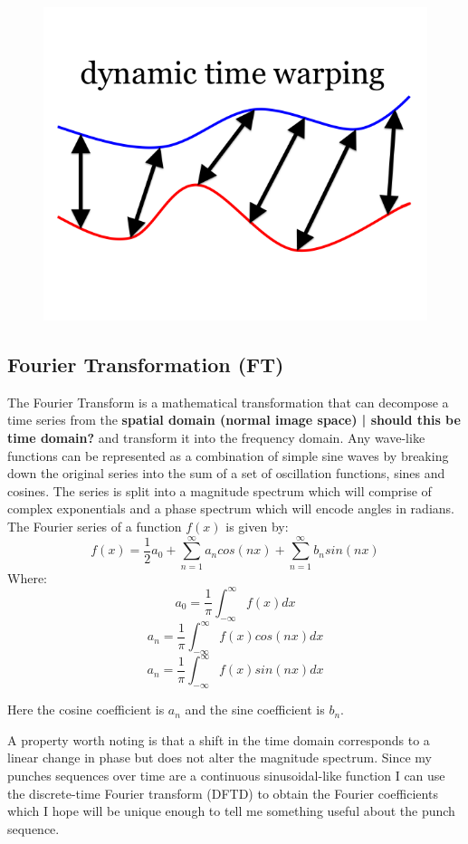 \begin{figure}[h]
    \centering
    \includegraphics[height=0.25\textheight]{fig02/dtw}
    \label{fig:kinect}
\end{figure}


\subsection{Fourier Transformation (FT)}
The Fourier Transform is a mathematical transformation that can decompose a time series from the {\bf spatial domain (normal image space) | should this be time domain?} and transform it into the frequency domain. Any wave-like functions can be represented as a combination of simple sine waves by breaking down the original series into the sum of a set of oscillation functions, sines and cosines. The series is split into a magnitude spectrum which will comprise of complex exponentials and a phase spectrum which will encode angles in radians. 
The Fourier series of a function $f(x)$ is given by:
$$f(x)=\frac{1}{2}a_0 + \sum_{n=1}^\infty a_n cos(nx) + \sum_{n=1}^\infty b_n sin(nx)$$
Where:
$$a_0 = \frac{1}{\pi}\int_{-\infty}^\infty f(x)dx$$
$$a_n = \frac{1}{\pi}\int_{-\infty}^\infty f(x)cos(nx)dx$$
$$a_n = \frac{1}{\pi}\int_{-\infty}^\infty f(x)sin(nx)dx$$

Here the cosine coefficient is $a_n$ and the sine coefficient is $b_n$.

A property worth noting is that a shift in the time domain corresponds to a linear change in phase but does not alter the magnitude spectrum. Since my punches sequences over time are a continuous sinusoidal-like function I can use the discrete-time Fourier transform (DFTD) to obtain the Fourier coefficients which I hope will be unique enough to tell me something useful about the punch sequence.

